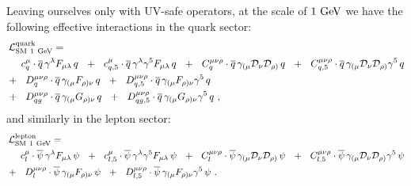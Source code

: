 \documentclass[12pt]{revtex4}
\newcommand{\ov}{\overline}
\newcommand{\md}{\mathcal{D}}
\newcommand{\GeV}{{\rm GeV}}
\begin{document}
	Leaving ourselves only with UV-safe operators, 
	at the scale of $ 1~\GeV $ we 
	have the following effective interactions in the quark sector:
\begin{align}
\nonumber
	\mathcal{L}_{\rm SM\ 1~GeV}^{\rm quark} = \hspace{-2.0cm}&
	\\
\nonumber
	&
	\phantom{+~~}
	c_{q}^\mu \cdot
	\ov{q}\, \gamma^\lambda F_{\mu\lambda}\, q 
	~~+~~
	c_{q,5}^\mu \cdot
	\ov{q}\, \gamma^\lambda \gamma^5 F_{\mu\lambda}\, q 
	~~+~~
	C_q^{\mu\nu\rho} \cdot
	\ov{q}\, \gamma_{(\mu} \md_\nu \md_{\rho)}\, q
	~~+~~
	C_{q,5}^{\mu\nu\rho} \cdot
	\ov{q}\, \gamma_{(\mu} \md_\nu \md_{\rho)}\gamma^5\, q
	\\
\label{SM_quark_1GeV}
	&
	+~~
	D_{q}^{\mu\nu\rho} \cdot
	\ov{q}\, \gamma_{(\mu} F_{\rho)\nu}\, q
	~~+~~
	D_{q,5}^{\mu\nu\rho} \cdot
	\ov{q}\, \gamma_{(\mu} F_{\rho)\nu}\gamma^5\, q
	\\
\nonumber
	&
	+~~
	D_{qg}^{\mu\nu\rho} \cdot
	\ov{q}\, \gamma_{(\mu} G_{\rho)\nu}\, q
	~~+~~
	D_{qg,5}^{\mu\nu\rho} \cdot
	\ov{q}\, \gamma_{(\mu} G_{\rho)\nu}\gamma^5\, q
	~,
\end{align}
	and similarly in the lepton sector:
\begin{align}
\nonumber
	\mathcal{L}_{\rm SM\ 1~GeV}^{\rm lepton} = \hspace{-2.0cm}&
	\\
\nonumber
	&
	\phantom{+~~}
	c_l^\mu \cdot
	\ov{\psi}\, \gamma^{\lambda} F_{\mu\lambda}\, \psi
	~~+~~
	c_{l,5}^\mu \cdot
	\ov{\psi}\, \gamma^{\lambda}\gamma^5 F_{\mu\lambda}\, \psi
	~~+~~
	C_l^{\mu\nu\rho} \cdot
	\ov{\psi}\, \gamma_{(\mu} \md_\nu \md_{\rho)}\, \psi
	~~+~~
	C_{l,5}^{\mu\nu\rho} \cdot
	\ov{\psi}\, \gamma_{(\mu} \md_\nu \md_{\rho)}\gamma^5\, \psi
	\\
\label{SM_lepton_1GeV}
	&
	+~~
	D_{l}^{\mu\nu\rho} \cdot
	\ov{\psi}\, \gamma_{(\mu} F_{\rho)\nu}\, \psi
	~~+~~
	D_{l,5}^{\mu\nu\rho} \cdot
	\ov{\psi}\, \gamma_{(\mu} F_{\rho)\nu}\gamma^5\, \psi
	~.
\end{align}
\end{document}

